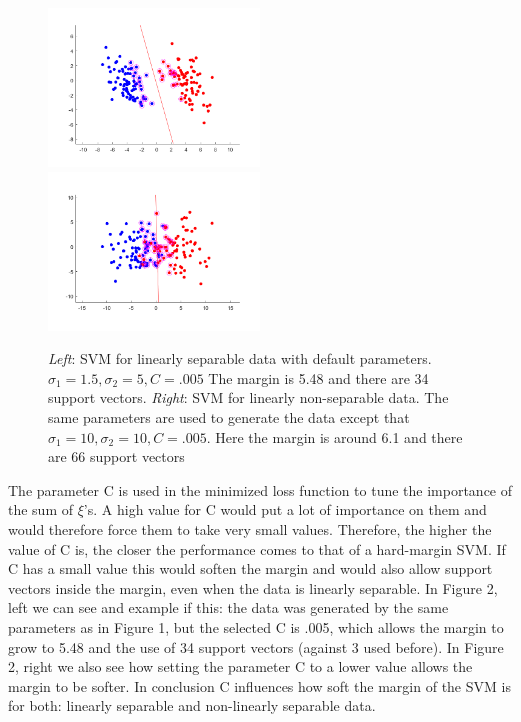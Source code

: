 \documentclass[12pt]{article}
\begin{document}
\begin{enumerate}[a)]
        
           	\begin{figure}[h]			
          		\includegraphics[width=0.5\textwidth]{1b_separableC005}
           		\includegraphics[width=0.5\textwidth]{1b_non-separableC005}
          		\caption{\textit{Left}: SVM for linearly separable data with default parameters. $ \sigma_1=1.5, \sigma_2=5, C = .005$ The margin is 5.48 and there are 34 support vectors. \textit{Right}: SVM for linearly non-separable data. The same parameters are used to generate the data except that $ \sigma_1=10, \sigma_2=10, C=.005 $. Here the margin is around 6.1 and there are 66 support vectors }
           	\end{figure}
        
		The parameter C is used in the minimized loss function to tune the importance of the sum of $\xi$'s. A high value for C would put a lot of importance on them and would therefore force them to take very small values. Therefore, the higher the value of C is, the closer the performance comes to that of a hard-margin SVM. If C has a small value this would soften the margin and would also allow support vectors inside the margin, even when the data is linearly separable. In Figure 2, left we can see and example if this: the data was generated by the same parameters as in Figure 1, but the selected C is .005, which allows the margin to grow to 5.48 and the use of 34 support vectors (against 3 used before). In Figure 2, right we also see how setting the parameter C to a lower value allows the margin to be softer. In conclusion C influences how soft the margin of the SVM is for both: linearly separable and non-linearly separable data.
\end{enumerate}
\end{document}
